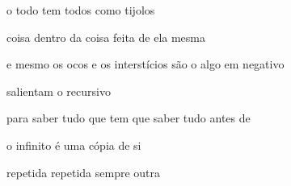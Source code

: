 \begin{poem}
\begin{stanza}
o todo tem todos\verseline
como tijolos
\end{stanza}
\begin{stanza}
coisa dentro da coisa\verseline
feita de ela mesma
\end{stanza}
\begin{stanza}
e mesmo os ocos\verseline
e os interstícios\verseline
são o algo\verseline
em negativo
\end{stanza}
\begin{stanza}
salientam\verseline
o recursivo
\end{stanza}
\begin{stanza}
para saber tudo\verseline
que tem que saber\verseline
\qquad \qquad tudo\verseline
antes de
\end{stanza}
\begin{stanza}
o infinito é\verseline
uma\verseline
cópia de si
\end{stanza}
\begin{stanza}
repetida repetida\verseline
sempre outra
\end{stanza}
\end{poem}